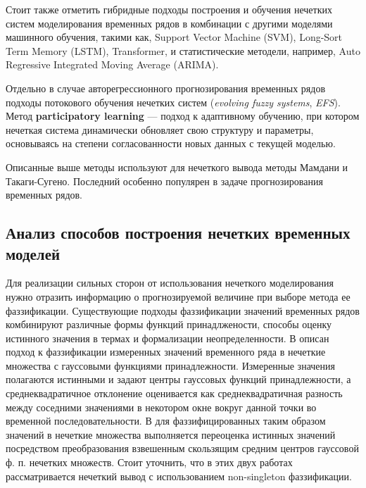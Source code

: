 Стоит также отметить гибридные подходы построения и обучения нечетких систем моделирования временных рядов в комбинации с другими моделями машинного обучения, такими как, Support Vector Machine (SVM), Long-Sort Term Memory (LSTM), Transformer, и статистические методели, например, Auto Regressive Integrated Moving Average (ARIMA).

Отдельно в случае авторегрессионного прогнозирования временных рядов подходы потокового обучения нечетких систем (\textit{evolving fuzzy systems}, \textit{EFS}). Метод \textbf{participatory learning} --- подход к адаптивному обучению, при котором нечеткая система динамически обновляет свою структуру и параметры, основываясь на степени согласованности новых данных с текущей моделью\cite{Lima2010, Alves2021}.

Описанные выше методы используют для нечеткого вывода методы Мамдани и Такаги-Сугено. Последний особенно популярен в задаче прогнозирования временных рядов.

\subsection{Анализ способов построения нечетких временных моделей}

Для реализации сильных сторон от использования нечеткого моделирования нужно отразить информацию о прогнозируемой величине при выборе метода ее фаззификации. Существующие подходы фаззификации значений временных рядов комбинируют различные формы функций принадлжености, способы оценку истинного значения в термах и формализации неопределенности. В \cite{Pekaslan2020} описан подход к фаззификации измеренных значений временного ряда в нечеткие множества с гауссовыми  функциями принадлежности. Измеренные значения полагаются истинными и задают центры гауссовых функций принадлежности, а среднеквадратичное отклонение оценивается как среднеквадратичная разность между соседними значениями в некотором окне вокруг данной точки во временной последовательности.  В \cite{Pourabdollah2017} для фаззифицированных таким образом значений в нечеткие множества выполняется переоценка истинных значений посредством преобразования взвешенным скользящим средним центров гауссовой ф. п. нечетких множеств.  Стоит уточнить, что в этих двух работах рассматривается нечеткий вывод с использованием non-singleton фаззификации.

